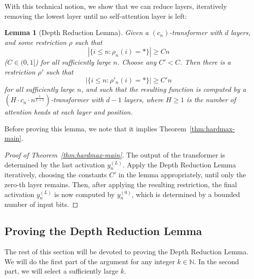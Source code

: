 \documentclass[11pt,a4paper]{article}
\newcounter{theorem}
\newtheorem{lemma}[theorem]{Lemma}
\begin{document}
With this technical notion, we show that we can reduce layers, iteratively removing the lowest layer until no self-attention layer is left:
\begin{lemma}[Depth Reduction Lemma]
Given a $(c_n)$-transformer with $d$ layers, and some restriction $\rho$ such that
\begin{equation}
|\{i \leq n: \rho_n(i) = *\}| \geq Cn
\end{equation}
($C \in (0,1]$)
for all sufficiently large $n$.
Choose any $C' < C$.
Then there is a restriction $\rho'$ 
such that
\begin{equation}
|\{i \leq n: \rho'_n(i) = *\}| \geq C'n
\end{equation}
for all sufficiently large $n$, 
and such that the resulting function is computed by a $(H\cdot c_n\cdot n^\frac{1}{L+1})$-transformer with $d-1$ layers, where $H \geq 1$ is the number of attention heads at each layer and position.
\end{lemma}
Before proving this lemma, we note that it implies Theorem~\ref{thm:hardmax-main}.
\begin{proof}[Proof of Theorem~\ref{thm:hardmax-main}]
The output of the transformer is determined by the last activation $y_{n}^{(L)}$.
Apply the Depth Reduction Lemma iteratively, choosing the constants $C'$ in the lemma appropriately, until only the zero-th layer remains.
Then, after applying the resulting restriction, the final activation $y_{n}^{(L)}$ is now computed by $y_{n}^{(0)}$, which is determined by a bounded number of input bits.
\end{proof}




\subsection{Proving the Depth Reduction Lemma}
The rest of this section will be devoted to proving the Depth Reduction Lemma.
We will do the first part of the argument for any integer $k \in \mathbb{N}$.
In the second part, we will select a sufficiently large $k$.
\end{document}
